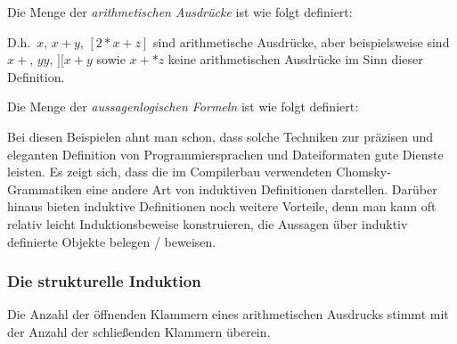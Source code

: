 \begin{example}
\label{induexp}
\noindent Die Menge der \emph{arithmetischen Ausdrücke} ist wie folgt definiert:

\medskip


\medskip

\noindent D.h.~$x$, $x+y$, $[2*x + z]$ sind arithmetische Ausdrücke,
aber beispielsweise sind $x + $, $yy$, $][x+y$ sowie $x +* z$ keine
arithmetischen Ausdrücke im Sinn dieser Definition.
\end{example}

\begin{example}
\label{indubool}
\noindent Die Menge der \emph{aussagenlogischen Formeln} ist wie folgt definiert:

\medskip

\end{example}

Bei diesen Beispielen ahnt man schon, dass solche Techniken zur
präzisen und eleganten Definition von Programmiersprachen und Dateiformaten gute
Dienste leisten. Es zeigt sich, dass die im Compilerbau verwendeten Chomsky-Grammatiken 
eine andere Art von induktiven Definitionen darstellen.  Darüber hinaus bieten induktive Definitionen  
noch weitere Vorteile, denn man kann oft relativ leicht Induktionsbeweise konstruieren, die  
Aussagen über induktiv definierte Objekte belegen / beweisen.

\subsubsection{Die strukturelle Induktion}

\begin{theorem}
\label{CntBrack}
Die Anzahl der öffnenden Klammern eines arithmetischen Ausdrucks stimmt
mit der Anzahl der schließenden Klammern überein.
\end{theorem}

